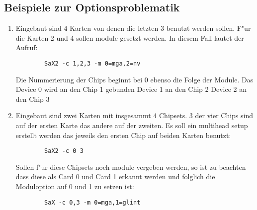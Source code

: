 \begin{appendix}
\chapter{Beispiele zur Optionsproblematik}

\begin{enumerate}
\item Eingebaut sind 4 Karten von denen die letzten 3 benutzt 
      werden sollen. F"ur die Karten 2 und 4 sollen module 
      gesetzt werden. In diesem Fall lautet der Aufruf:
      \begin{verbatim}
        SaX2 -c 1,2,3 -m 0=mga,2=nv
      \end{verbatim}
      Die Nummerierung der Chips beginnt bei 0 ebenso die
      Folge der Module. Das Device 0 wird an den Chip 1 gebunden
      Device 1 an den Chip 2 Device 2 an den Chip 3

\item Eingebaut sind zwei Karten mit insgesammt 4 Chipsets.
      3 der vier Chips sind auf der ersten Karte das andere auf der
      zweiten. Es soll ein multihead setup erstellt werden das jeweils
      den ersten Chip auf beiden Karten benutzt:
      \begin{verbatim}
        SaX2 -c 0 3 
      \end{verbatim}
      Sollen f"ur diese Chipsets noch module vergeben werden, so ist 
      zu beachten dass diese als Card 0 und Card 1 erkannt werden und 
      folglich die Moduloption auf 0 und 1 zu setzen ist: 
      \begin{verbatim}
        SaX -c 0,3 -m 0=mga,1=glint
      \end{verbatim}
\end{enumerate}


\end{appendix}

